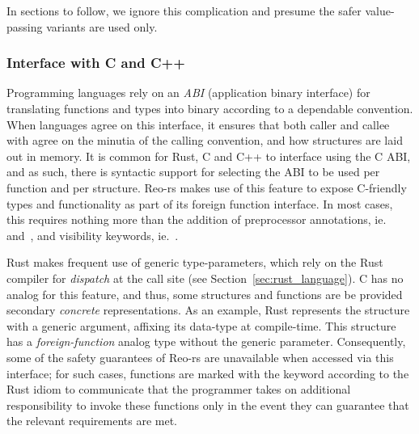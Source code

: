 In sections to follow, we ignore this complication and presume the safer value-passing variants are used only.

\subsubsection{Interface with C and C++}
Programming languages rely on an \textit{ABI} (application binary interface) for translating functions and types into binary according to a dependable convention. When languages agree on this interface, it ensures that both caller and callee with agree on the minutia of the calling convention, and how structures are laid out in memory. It is common for Rust, C and C++ to interface using the C ABI, and as such, there is syntactic support for selecting the ABI to be used per function and per structure. Reo-rs makes use of this feature to expose C-friendly types and functionality as part of its foreign function interface. In most cases, this requires nothing more than the addition of preprocessor annotations, ie.\ \code{\#[repr(C)]} and~\code{\#[no\_mangle]}, and visibility keywords, ie.~.

Rust makes frequent use of generic type-parameters, which rely on the Rust compiler for \textit{dispatch} at the call site (see Section~\ref{sec:rust_language}). C has no analog for this feature, and thus, some structures and functions are be provided secondary \textit{concrete} representations. As an example, Rust represents the  structure with a generic argument, affixing its data-type at compile-time. This structure has a \textit{foreign-function} analog type without the generic parameter. Consequently, some of the safety guarantees of Reo-rs are unavailable when accessed via this interface; for such cases, functions are marked with the  keyword according to the Rust idiom to communicate that the programmer takes on additional responsibility to invoke these functions only in the event they can guarantee that the relevant requirements are met.

